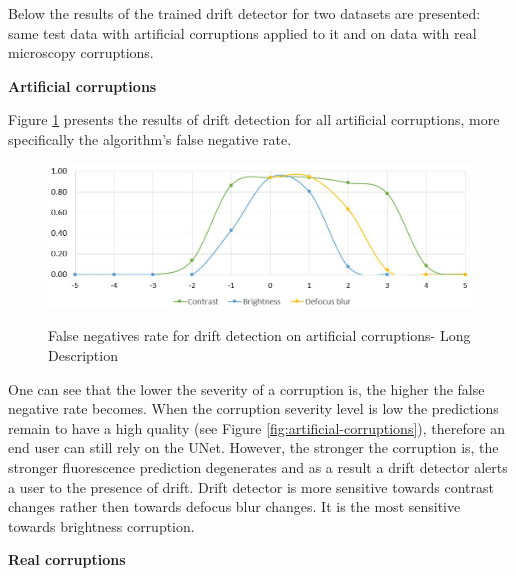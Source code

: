 Below the results of the trained drift detector for two datasets are presented: same test data with artificial corruptions applied to it and on data with real microscopy corruptions. 

\textbf{Artificial corruptions}

Figure \ref{fig:fn-rate} presents the results of drift detection for all artificial corruptions, more specifically the algorithm's false negative rate.
\begin{figure}[H]
	\begin{center}
		\includegraphics[width=\linewidth]{bilder/drift-detection/fn-rate.jpg}
		\caption[False negatives rate for drift detection on artificial corruptions]%
		{False negatives rate for drift detection on artificial corruptions- Long Description}{}\label{fig:fn-rate}
	\end{center}
\end{figure}
One can see that the lower the severity of a corruption is, the higher the false negative rate becomes. When the corruption severity level is low the predictions remain to have a high quality (see Figure \ref{fig:artificial-corruptions}), therefore an end user can still rely on the UNet. However, the stronger the corruption is, the stronger fluorescence prediction degenerates and as a result a drift detector alerts a user to the presence of drift. Drift detector is more sensitive towards contrast changes rather then towards defocus blur changes. It is the most sensitive towards brightness corruption.

\textbf{Real corruptions}


